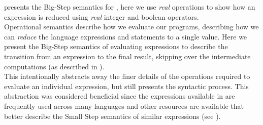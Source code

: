  presents the Big-Step semantics for \thePolicyLang, here we use \emph{real} operations to show how an expression is reduced using \emph{real} integer and boolean operators.\\
Operational semantics describe how we evaluate our programs, describing how we can \emph{reduce} the \thePolicyLang language expressions and statements to a single value. Here we present the Big-Step semantics of evaluating expressions to describe the transition from an expression to the final result, skipping over the intermediate computations (as described in \citet{Myers2007}).\\
This intentionally abstracts away the finer details of the operations required to evaluate an individual expression, but still presents the syntactic process. This abstraction was considered beneficial since the expressions available in \thePolicyLang are frequently used across many languages and other resources are available that better describe the Small Step semantics of similar expressions (see \citet{Sewell2009, DBLP:conf/lomaps/Schmidt96}).
